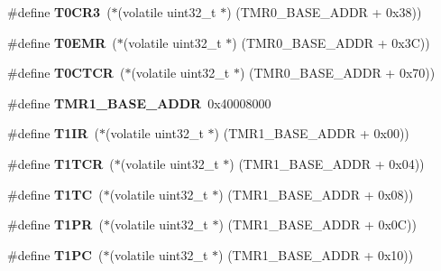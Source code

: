 \begin{DoxyCompactItemize}
\#define {\bfseries T0\+C\+R3}~($\ast$(volatile uint32\+\_\+t $\ast$) (T\+M\+R0\+\_\+\+B\+A\+S\+E\+\_\+\+A\+D\+DR + 0x38))
\item 
\mbox{\label{group__lpc24xx__regs_ga3f7bfa7a4ec72334b5628f6f0b2276fa}} 
\#define {\bfseries T0\+E\+MR}~($\ast$(volatile uint32\+\_\+t $\ast$) (T\+M\+R0\+\_\+\+B\+A\+S\+E\+\_\+\+A\+D\+DR + 0x3\+C))
\item 
\mbox{\label{group__lpc24xx__regs_ga1dfe6470ef76d008806fc8b9f7428af9}} 
\#define {\bfseries T0\+C\+T\+CR}~($\ast$(volatile uint32\+\_\+t $\ast$) (T\+M\+R0\+\_\+\+B\+A\+S\+E\+\_\+\+A\+D\+DR + 0x70))
\item 
\mbox{\label{group__lpc24xx__regs_gaad3dc650b516f248d2a5cd3073d4e461}} 
\#define {\bfseries T\+M\+R1\+\_\+\+B\+A\+S\+E\+\_\+\+A\+D\+DR}~0x40008000
\item 
\mbox{\label{group__lpc24xx__regs_gadb98681e25a22c370f83fe86a093de94}} 
\#define {\bfseries T1\+IR}~($\ast$(volatile uint32\+\_\+t $\ast$) (T\+M\+R1\+\_\+\+B\+A\+S\+E\+\_\+\+A\+D\+DR + 0x00))
\item 
\mbox{\label{group__lpc24xx__regs_ga10ed50586274919ac0318a280d09ab30}} 
\#define {\bfseries T1\+T\+CR}~($\ast$(volatile uint32\+\_\+t $\ast$) (T\+M\+R1\+\_\+\+B\+A\+S\+E\+\_\+\+A\+D\+DR + 0x04))
\item 
\mbox{\label{group__lpc24xx__regs_ga17688b0757c26205ffffdd5549d9970f}} 
\#define {\bfseries T1\+TC}~($\ast$(volatile uint32\+\_\+t $\ast$) (T\+M\+R1\+\_\+\+B\+A\+S\+E\+\_\+\+A\+D\+DR + 0x08))
\item 
\mbox{\label{group__lpc24xx__regs_ga8f87cbff71173b0b6fc0494bc7e4a019}} 
\#define {\bfseries T1\+PR}~($\ast$(volatile uint32\+\_\+t $\ast$) (T\+M\+R1\+\_\+\+B\+A\+S\+E\+\_\+\+A\+D\+DR + 0x0\+C))
\item 
\mbox{\label{group__lpc24xx__regs_ga9f3a3649d53d672c4345687f87167760}} 
\#define {\bfseries T1\+PC}~($\ast$(volatile uint32\+\_\+t $\ast$) (T\+M\+R1\+\_\+\+B\+A\+S\+E\+\_\+\+A\+D\+DR + 0x10))
\item 

\end{DoxyCompactItemize}
